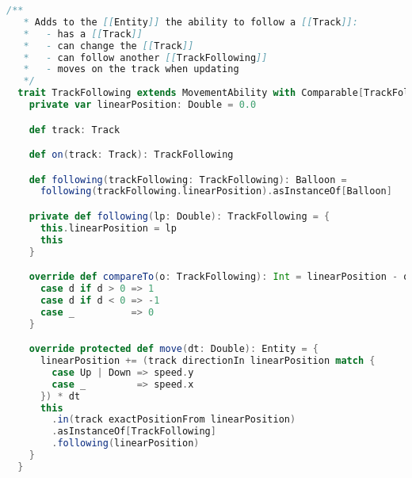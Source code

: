 \begin{lstlisting}[label=code:track-following, language=Scala, caption=Interfaccia estesa dai palloncini per rimanere
sul tracciato]
/**
   * Adds to the [[Entity]] the ability to follow a [[Track]]:
   *   - has a [[Track]]
   *   - can change the [[Track]]
   *   - can follow another [[TrackFollowing]]
   *   - moves on the track when updating
   */
  trait TrackFollowing extends MovementAbility with Comparable[TrackFollowing] { balloon: Balloon =>
    private var linearPosition: Double = 0.0

    def track: Track

    def on(track: Track): TrackFollowing

    def following(trackFollowing: TrackFollowing): Balloon =
      following(trackFollowing.linearPosition).asInstanceOf[Balloon]

    private def following(lp: Double): TrackFollowing = {
      this.linearPosition = lp
      this
    }

    override def compareTo(o: TrackFollowing): Int = linearPosition - o.linearPosition match {
      case d if d > 0 => 1
      case d if d < 0 => -1
      case _          => 0
    }

    override protected def move(dt: Double): Entity = {
      linearPosition += (track directionIn linearPosition match {
        case Up | Down => speed.y
        case _         => speed.x
      }) * dt
      this
        .in(track exactPositionFrom linearPosition)
        .asInstanceOf[TrackFollowing]
        .following(linearPosition)
    }
  }
\end{lstlisting}